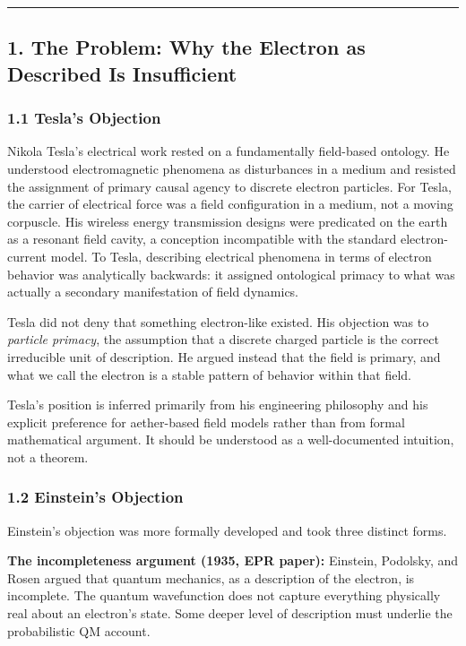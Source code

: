 \documentclass[
  11pt,
  letterpaper,
]{article}
\begin{document}
\begin{center}\rule{0.5\linewidth}{0.5pt}\end{center}

\subsection{1. The Problem: Why the Electron as Described Is
Insufficient}\label{the-problem-why-the-electron-as-described-is-insufficient}

\subsubsection{1.1 Tesla's Objection}\label{teslas-objection}

Nikola Tesla's electrical work rested on a fundamentally field-based
ontology. He understood electromagnetic phenomena as disturbances in a
medium and resisted the assignment of primary causal agency to discrete
electron particles. For Tesla, the carrier of electrical force was a
field configuration in a medium, not a moving corpuscle. His wireless
energy transmission designs were predicated on the earth as a resonant
field cavity, a conception incompatible with the standard
electron-current model. To Tesla, describing electrical phenomena in
terms of electron behavior was analytically backwards: it assigned
ontological primacy to what was actually a secondary manifestation of
field dynamics.

Tesla did not deny that something electron-like existed. His objection
was to \emph{particle primacy}, the assumption that a discrete charged
particle is the correct irreducible unit of description. He argued
instead that the field is primary, and what we call the electron is a
stable pattern of behavior within that field.

Tesla's position is inferred primarily from his engineering philosophy
and his explicit preference for aether-based field models rather than
from formal mathematical argument. It should be understood as a
well-documented intuition, not a theorem.

\subsubsection{1.2 Einstein's Objection}\label{einsteins-objection}

Einstein's objection was more formally developed and took three distinct
forms.

\textbf{The incompleteness argument (1935, EPR paper):} Einstein,
Podolsky, and Rosen argued that quantum mechanics, as a description of
the electron, is incomplete. The quantum wavefunction does not capture
everything physically real about an electron's state. Some deeper level
of description must underlie the probabilistic QM account.
\end{document}

